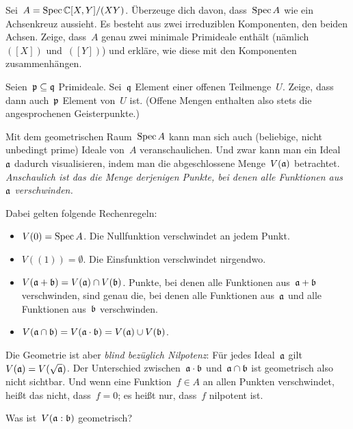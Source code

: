 \documentclass{uebblatt}
\begin{document}
\begin{fun}Sei~$A = \operatorname{Spec} \mathbb{C}[X,Y]/(XY)$. Überzeuge dich davon, dass~$\operatorname{Spec} A$
wie ein Achsenkreuz aussieht. Es besteht aus zwei irreduziblen Komponenten, den
beiden Achsen. Zeige, dass~$A$ genau zwei minimale Primideale enthält
(nämlich~$([X])$ und~$([Y])$) und erkläre, wie diese mit den Komponenten
zusammenhängen.
\end{fun}

\begin{fun}Seien~$\mathfrak{p} \subseteq \mathfrak{q}$ Primideale. Sei~$\mathfrak{q}$ Element einer
offenen Teilmenge~$U$. Zeige, dass dann auch~$\mathfrak{p}$ Element von~$U$ ist.
(Offene Mengen enthalten also stets die angesprochenen Geisterpunkte.)
\end{fun}

Mit dem geometrischen Raum~$\operatorname{Spec} A$ kann man sich auch (beliebige, nicht
unbedingt prime) Ideale von~$A$ veranschaulichen. Und zwar kann man ein
Ideal~$\mathfrak{a}$ dadurch visualisieren, indem man die abgeschlossene
Menge~$V(\mathfrak{a})$ betrachtet. \emph{Anschaulich ist das die Menge derjenigen
Punkte, bei denen alle Funktionen aus~$\mathfrak{a}$ verschwinden.}

Dabei gelten folgende Rechenregeln:

\begin{itemize}
\item $V(0) = \operatorname{Spec} A$. Die Nullfunktion verschwindet an jedem Punkt.
\item $V((1)) = \emptyset$. Die Einsfunktion verschwindet nirgendwo.
\item $V(\mathfrak{a} + \mathfrak{b}) = V(\mathfrak{a}) \cap V(\mathfrak{b})$. Punkte, bei denen alle
Funktionen aus~$\mathfrak{a} + \mathfrak{b}$ verschwinden, sind genau die, bei denen alle
Funktionen aus~$\mathfrak{a}$ und alle Funktionen aus~$\mathfrak{b}$ verschwinden.
\item $V(\mathfrak{a} \cap \mathfrak{b}) = V(\mathfrak{a} \cdot \mathfrak{b}) = V(\mathfrak{a}) \cup V(\mathfrak{b})$.
\end{itemize}

Die Geometrie ist aber \emph{blind bezüglich Nilpotenz}: Für jedes Ideal~$\mathfrak{a}$
gilt~$V(\mathfrak{a}) = V(\sqrt{\mathfrak{a}})$. Der Unterschied zwischen~$\mathfrak{a} \cdot \mathfrak{b}$
und~$\mathfrak{a} \cap \mathfrak{b}$ ist geometrisch also nicht sichtbar.
Und wenn eine Funktion~$f \in A$ an allen Punkten verschwindet, heißt das
nicht, dass~$f = 0$; es heißt nur, dass~$f$ nilpotent ist.

\begin{fun}Was ist~$V(\mathfrak{a} : \mathfrak{b})$ geometrisch?\end{fun}
\end{document}
